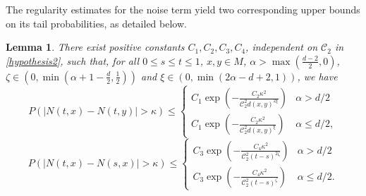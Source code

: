 \documentclass[12pt]{amsart}
\newtheorem{lemma}{Lemma}[section]
\numberwithin{equation}{section}
\newcommand{\1}{\mathbf{1}}
\begin{document}
The regularity estimates for the noise term yield two corresponding upper bounds on its tail probabilities, as detailed below.
\begin{lemma} There exist positive constants $C_1,C_2,C_3,C_4$, independent on $\mathcal{C}_2$ in \eqref{hypothesis2}, such that, for all $0\leq s\leq t\leq 1$, $x,y\in M$, $\alpha>\max\left(\frac{d-2}{2},0\right)$, $\zeta\in\left(0,\min\left(\alpha+1-\frac{d}{2},\frac{1}{2}\right)\right)$ and $\xi\in(0,\min\left(2\alpha-d+2,1\right))$, we have
\begin{equation}
\label{spacep}
P(\vert N(t,x)-N(t,y)\vert>\kappa)\leq\begin{cases}
C_1\exp\left(-\frac{C_2\kappa^2}{\mathcal{C}_2^2d(x,y)^{2\xi}}\right)
    &\alpha>d/2\\
    C_1\exp\left(-\frac{C_2\kappa^2}{\mathcal{C}_2^2d(x,y)^{\xi}}\right) &\alpha\leq d/2,
    \end{cases}
\end{equation}
\begin{equation}
\label{timep}
P(\vert N(t,x)-N(s,x)\vert>\kappa)\leq\begin{cases}
C_3\exp\left(-\frac{C_4\kappa^2}{\mathcal{C}_2^2(t-s)^{2\zeta}}\right)
    &\alpha>d/2\\
   C_3\exp\left(-\frac{C_4\kappa^2}{\mathcal{C}_2^2(t-s)^{\zeta}}\right) &\alpha\leq d/2.
    \end{cases}
\end{equation}
\end{lemma}
\end{document}
